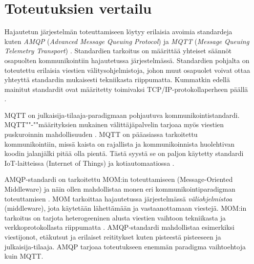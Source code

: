 

\section{Toteutuksien vertailu}
Hajautetun järjestelmän toteuttamiseen löytyy erilaisia avoimia standardeja kuten \emph{AMQP} (\emph{Advanced Message Queuing Protocol}) \cite{amqp-homepage} ja \emph{MQTT} (\emph{Message Queuing Telemetry Transport}) \cite{mqtt-homepage}. Standardien tarkoitus on määrittää yhteiset säännöt osapuolten kommunikointiin hajautetussa järjestelmässä. Standardien pohjalta on toteutettu erilaisia viestien välitysohjelmistoja, johon muut osapuolet voivat ottaa yhteyttä standardin mukaisesti tekniikasta riippumatta. Kummatkin edellä mainitut standardit ovat määritetty toimivaksi TCP/IP-protokollaperheen päällä \cite[s.~1]{mqtt-specification} \cite[s.~22]{AMQP-specification}.

MQTT on julkaisija-tilaaja-paradigmaan pohjautuva kommunikointistandardi. MQTT""-""mää\-ri\-tyk\-si\-en mukainen välittäjäpalvelin tarjoaa myös viestien puskuroinnin mahdollisuuden \cite{mqtt-specification}. MQTT on pääasiassa tarkoitettu kommunikointiin, missä kaista on rajallista ja kommunikoinnista huolehtivan koodin jalanjälki pitää olla pientä. Tästä syystä se on paljon käytetty standardi IoT-laitteissa (Internet of Things) ja kotiautomaatiossa \cite[s.~9--11]{mqtt-for-iot}.

AMQP-standardi on tarkoitettu MOM:in toteuttamiseen (Message-Oriented Middleware) ja näin ollen mahdollistaa monen eri kommunikointiparadigman toteuttamisen \cite[s.~6]{AMQP-specification}. MOM tarkoittaa hajautetussa järjestelmässä \emph{väliohjelmistoa} (middleware), jota käytetään lähettämään ja vastaanottamaan viestejä. MOM:in tarkoitus on tarjota heterogeeninen alusta viestien vaihtoon tekniikasta ja verkkoprotokollasta riippumatta \cite{mom}. AMQP-standardi mahdollistaa esimerkiksi viestijonot, etäkutsut ja erilaiset reititykset kuten pisteestä pisteeseen ja julkaisija-tilaaja. AMQP tarjoaa toteutukseen enemmän paradigma vaihtoehtoja kuin MQTT.


